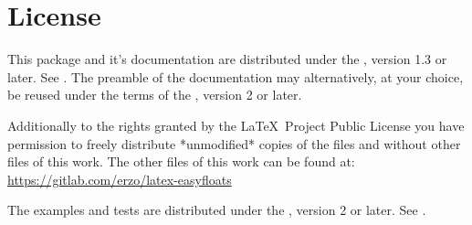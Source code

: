 
\section{License}
\label{license}

This package and it's documentation are distributed under the , version 1.3 or later.
See .
The preamble of the documentation may alternatively, at your choice, be reused under the terms of the , version 2 or later.

Additionally to the rights granted by the \LaTeX\ Project Public License
you have permission to freely distribute *unmodified* copies
of the files  and  without other files of this work.
The other files of this work can be found at:
\url{https://gitlab.com/erzo/latex-easyfloats}

The examples and tests are distributed under the , version 2 or later.
See .
